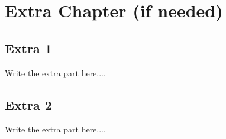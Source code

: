 \chapter{Extra Chapter (if needed)}



\section{Extra 1}
Write the extra part here....

\section{Extra 2}
Write the extra part here....